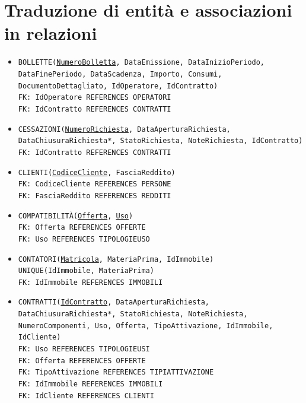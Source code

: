 \documentclass[a4paper,12pt]{report}
\begin{document}
\section{Traduzione di entità e associazioni in relazioni}
\begin{itemize}
    \item \texttt{BOLLETTE(\underline{NumeroBolletta}, DataEmissione, DataInizioPeriodo, DataFinePeriodo, DataScadenza, Importo, Consumi, DocumentoDettagliato, IdOperatore, IdContratto) \\
    FK: IdOperatore REFERENCES OPERATORI \\
    FK: IdContratto REFERENCES CONTRATTI}
    
    \item \texttt{CESSAZIONI(\underline{NumeroRichiesta}, DataAperturaRichiesta, DataChiusuraRichiesta*, StatoRichiesta, NoteRichiesta, IdContratto) \\
    FK: IdContratto REFERENCES CONTRATTI}
    
    \item \texttt{CLIENTI(\underline{CodiceCliente}, FasciaReddito) \\
    FK: CodiceCliente REFERENCES PERSONE \\
    FK: FasciaReddito REFERENCES REDDITI}
    
    \item \texttt{COMPATIBILITÀ(\underline{Offerta}, \underline{Uso}) \\
    FK: Offerta REFERENCES OFFERTE \\
    FK: Uso REFERENCES TIPOLOGIE\textunderscore USO
    }
    
    \item \texttt{CONTATORI(\underline{Matricola}, MateriaPrima, IdImmobile) \\
    UNIQUE(IdImmobile, MateriaPrima) \\
    FK: IdImmobile REFERENCES IMMOBILI}
    
    \item \texttt{CONTRATTI(\underline{IdContratto}, DataAperturaRichiesta, DataChiusuraRichiesta*, StatoRichiesta, NoteRichiesta, NumeroComponenti, Uso, Offerta, TipoAttivazione, IdImmobile, IdCliente) \\
    FK: Uso REFERENCES TIPOLOGIE\textunderscore USI \\
    FK: Offerta REFERENCES OFFERTE \\
    FK: TipoAttivazione REFERENCES TIPI\textunderscore ATTIVAZIONE \\
    FK: IdImmobile REFERENCES IMMOBILI \\
    FK: IdCliente REFERENCES CLIENTI}
    

\end{itemize}
\end{document}

